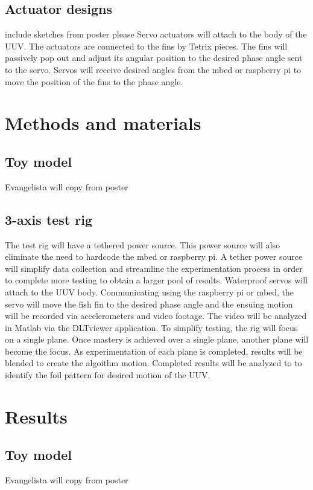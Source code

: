 \documentclass[twocolumn,10pt]{IEEEtran}
\begin{document}
\subsection{Actuator designs}
include sketches from poster please
Servo actuators will attach to the body of the UUV.  The actuators are connected to the fins by Tetrix pieces.  The fins will passively pop out and adjust its angular position to the desired phase angle sent to the servo.  Servos will receive desired angles from the mbed or raspberry pi to move the position of the fins to the phase angle.  

\section{Methods and materials}
\subsection{Toy model}
Evangelista will copy from poster
\subsection{3-axis test rig}
The test rig will have a tethered power source.  This power source will also eliminate the need to hardcode the mbed or raspberry pi.  A tether power source will simplify data collection and streamline the experimentation process in order to complete more testing to obtain a larger pool of results.  Waterproof servos will attach to the UUV body.  Communicating using the raspberry pi or mbed, the servo will move the fish fin to the desired phase angle and the ensuing motion will be recorded via accelerometers and video footage.  The video will be analyzed in Matlab via the DLTviewer application.  To simplify testing, the rig will focus on a single plane.  Once mastery is achieved over a single plane, another plane will become the focus.  As experimentation of each plane is completed, results will be blended to create the algoithm motion.  Completed results will be analyzed to to identify the foil pattern for desired motion of the UUV. 
\section{Results}
\subsection{Toy model}
Evangelista will copy from poster
\end{document}

